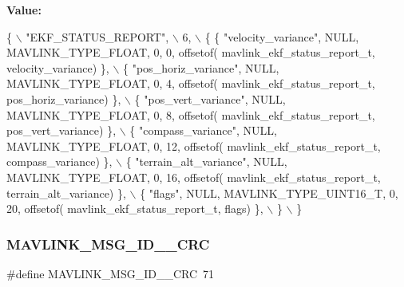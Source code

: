 {\bfseries Value\+:}
\begin{DoxyCode}
\{ \(\backslash\)
    \textcolor{stringliteral}{"EKF\_STATUS\_REPORT"}, \(\backslash\)
    6, \(\backslash\)
    \{  \{ \textcolor{stringliteral}{"velocity\_variance"}, NULL, MAVLINK_TYPE_FLOAT, 0, 0, offsetof(
      mavlink_ekf_status_report_t, velocity\_variance) \}, \(\backslash\)
         \{ \textcolor{stringliteral}{"pos\_horiz\_variance"}, NULL, MAVLINK_TYPE_FLOAT, 0, 4, offsetof(
      mavlink_ekf_status_report_t, pos\_horiz\_variance) \}, \(\backslash\)
         \{ \textcolor{stringliteral}{"pos\_vert\_variance"}, NULL, MAVLINK_TYPE_FLOAT, 0, 8, offsetof(
      mavlink_ekf_status_report_t, pos\_vert\_variance) \}, \(\backslash\)
         \{ \textcolor{stringliteral}{"compass\_variance"}, NULL, MAVLINK_TYPE_FLOAT, 0, 12, offsetof(
      mavlink_ekf_status_report_t, compass\_variance) \}, \(\backslash\)
         \{ \textcolor{stringliteral}{"terrain\_alt\_variance"}, NULL, MAVLINK_TYPE_FLOAT, 0, 16, offsetof(
      mavlink_ekf_status_report_t, terrain\_alt\_variance) \}, \(\backslash\)
         \{ \textcolor{stringliteral}{"flags"}, NULL, MAVLINK_TYPE_UINT16_T, 0, 20, offsetof(
      mavlink_ekf_status_report_t, flags) \}, \(\backslash\)
         \} \(\backslash\)
\}
\end{DoxyCode}
\mbox{\label{mavlink__msg__ekf__status__report_8h_a0b034917676f25c18099845060fb48b5}} 
\subsubsection{M\+A\+V\+L\+I\+N\+K\+\_\+\+M\+S\+G\+\_\+\+I\+D\+\_\+\_\+\+C\+RC}
{\footnotesize\ttfamily \#define M\+A\+V\+L\+I\+N\+K\+\_\+\+M\+S\+G\+\_\+\+I\+D\+\_\+\_\+\+C\+RC~71}

\mbox{\label{mavlink__msg__ekf__status__report_8h_a466e03f9aeb27adbed67bb915bde4c5d}} 
